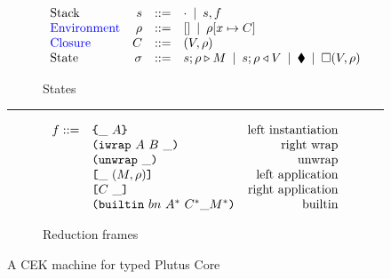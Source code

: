 \documentclass[../plutus-core-specification.tex]{subfiles}
\begin{document}
\begin{figure}[!ht]
\begin{subfigure}[c]{\linewidth}        %
\[
\begin{array}{lrcl}
        \textrm{Stack} & s      & ::= & \cdot \enspace | \enspace s,f    \\
        \textcolor{blue}{ \textrm{Environment}} & \rho & ::= & [] \enspace | \enspace \rho[x \mapsto C] \\
        \textcolor{blue}{ \textrm{Closure}} & C  & ::= & (V,\rho) \\
        \textrm{State} & \sigma & ::= & s;\rho \triangleright M \enspace | \enspace s;\rho \triangleleft V  \enspace | \enspace \blacklozenge{} \enspace | \enspace \square (V,\rho)
    \end{array}
\]
\caption{States}
\end{subfigure}

\vspace{1mm}
\hrule
\vspace{2mm}

\begin{subfigure}[c]{\linewidth}  %
\[
    \begin{array}{rlr}
       f ::= & \texttt{\{}\_ ~ A\texttt{\}}                     & \textrm{left instantiation}\\
             & \texttt{(} \texttt{iwrap} ~ A ~ B ~ \_ \texttt{)}            & \textrm{right wrap}\\
             & \texttt{(} \texttt{unwrap} ~ \_ \texttt{)}{}                        & \textrm{unwrap}\\
             & \texttt{[} \_ ~ (M,\rho) \texttt{]}                 & \textrm{left application}\\
             & \texttt{[} C ~ \_ \texttt{]}                & \textrm{right application}\\
             & \texttt{(} \texttt{builtin} ~ bn ~ A^* ~ C^* \_ M^* \texttt{)}        & \textrm{builtin}\\
    \end{array}
\]
\caption{Reduction frames}
\end{subfigure}

\caption{A CEK machine for typed Plutus Core}\label{fig:cek-machine}
\end{figure}
\end{document}

